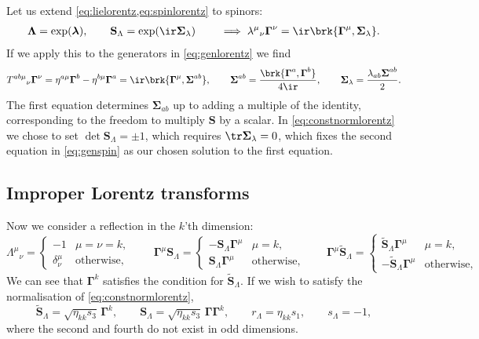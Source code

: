 \documentclass[11pt]{article}
\newcommand{\Gammab}{\boldsymbol{\Gamma}}
\renewcommand{\S}{\mathbf{S}}
\newcommand{\St}{\widetilde{\S}}
\newcommand{\Sigmab}{\boldsymbol{\Sigma}}
\newcommand{\Lambdab}{\boldsymbol{\Lambda}}
\newcommand{\lambdab}{\boldsymbol{\lambda}}
\begin{document}
Let us extend \cref{eq:lielorentz,eq:spinlorentz} to spinors:
%
\begin{equation}\label{eq:liespin}
\begin{aligned}
  \Lambdab = \exp(\lambdab),
  \qquad
  \S_\Lambda = \exp(\ir \Sigmab_\lambda)
  \qquad \implies
  \lambda^\mu{}_\nu \Gammab^\nu = \ir \brk{\Gammab^\mu, \Sigmab_\lambda}.
\end{aligned}
\end{equation}
%
If we apply this to the generators in \cref{eq:genlorentz} we find
%
\begin{equation}\label{eq:genspin}
  T^{ab\mu}{}_\nu \Gammab^\nu
    = \eta^{a\mu} \Gammab^b - \eta^{b\mu} \Gammab^a 
    = \ir \brk{\Gammab^\mu, \Sigmab^{ab}},
  \qquad
  \Sigmab^{ab} = \frac{\brk{\Gammab^a, \Gammab^b}}{4\ir},
  \qquad
  \Sigmab_\lambda = \frac{\lambda_{ab} \Sigmab^{ab}}{2}.
\end{equation}
%
The first equation determines \(\Sigmab_{ab}\) up to adding a multiple of the identity, corresponding to the freedom to multiply \(\S\) by a scalar.
In \cref{eq:constnormlorentz} we chose to set \(\det \S_\Lambda = \pm 1\), which requires \(\tr \Sigmab_\lambda = 0\), which fixes the second equation in \cref{eq:genspin} as our chosen solution to the first equation.



\subsection{Improper Lorentz transforms}\label{sec:reflectlorentz}

Now we consider a reflection in the \(k\)'th dimension:
%
\begin{equation*}
  \Lambda^\mu{}_\nu 
    = \begin{cases}
        -1 & \mu = \nu = k, \\
        \delta^\mu_\nu & \text{otherwise},
      \end{cases}
  \qquad
  \Gammab^\mu \S_\Lambda
  = \begin{cases}
    -\S_\Lambda \Gammab^\mu & \mu = k, \\
    \S_\Lambda \Gammab^\mu & \text{otherwise},
  \end{cases}
  \qquad
  \Gammab^\mu \St_\Lambda
  = \begin{cases}
    \St_\Lambda \Gammab^\mu & \mu = k, \\
    -\St_\Lambda \Gammab^\mu & \text{otherwise},
  \end{cases}
\end{equation*}
%
We can see that \(\Gammab^k\) satisfies the condition for \(\St_\Lambda\).
If we wish to satisfy the normalisation of \cref{eq:constnormlorentz},
%
\begin{equation}\label{eq:reflect}
  \St_\Lambda = \sqrt{\eta_{kk}s_3}\, \Gammab^k, \qquad
  \S_\Lambda = \sqrt{\eta_{kk}s_3}\, \Gammab \Gammab^k, \qquad
  r_\Lambda = \eta_{kk} s_1, \qquad
  s_\Lambda = -1, 
\end{equation}
%
where the second and fourth do not exist in odd dimensions.
\end{document}
